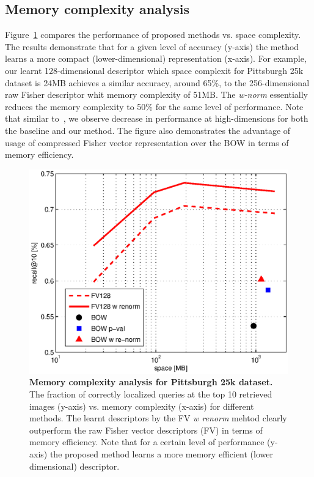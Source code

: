   \subsection{Memory complexity analysis}
    Figure~\ref{fig:memory} compares the performance of proposed methods vs. space complexity. The results demonstrate that for a given level of accuracy (y-axis) the method learns a more compact (lower-dimensional) representation (x-axis). 
    For example, our learnt 128-dimensional descriptor which space complexit for Pittsburgh 25k dataset is 24MB achieves a similar accuracy, around 65\%, to the 256-dimensional raw Fisher descriptor whit memory complexity of 51MB. The \emph{w-norm} essentially reduces the memory complexity to 50\% for the same level of performance. Note that similar to~\cite{Jegou12}, we observe decrease in performance at high-dimensions for both the baseline and our method. The figure also demonstrates the advantage of usage of compressed Fisher vector representation over the BOW in terms of memory efficiency.  

    \begin{figure}[t!]
        \centering
        \includegraphics[width=1.1\linewidth]{imgs/FVmemory02}    
        \caption{
            \textbf{Memory complexity analysis for Pittsburgh 25k dataset.} 
            The fraction of correctly localized queries at the top 10 retrieved images (y-axis) vs. memory complexity (x-axis) for different methods. The learnt descriptors by the FV \emph{w renorm} mehtod clearly outperform the raw Fisher vector descriptors (FV) in terms of memory efficiency. Note that for a certain level of performance (y-axis) the proposed method learns a more memory efficient (lower dimensional) descriptor.
        }
        \label{fig:memory}
    \end{figure}

